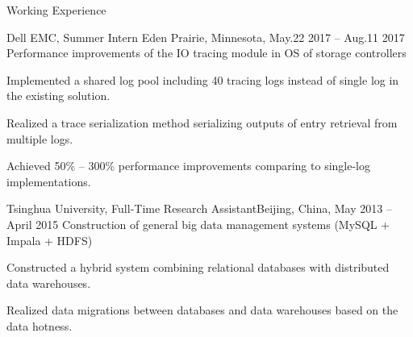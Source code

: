 \documentclass{resume} %
\begin{document}
\begin{rSection}{Working Experience}

\begin{rSubsection}{Dell EMC, Summer Intern} {Eden Prairie, Minnesota, May.22 2017 -- Aug.11 2017} 
{Performance improvements of the IO tracing module in OS of storage controllers} {}
\item Implemented a shared log pool including 40 tracing logs instead of single log in the existing solution.
\item Realized a trace serialization method serializing outputs of entry retrieval from multiple logs.
\item Achieved 50\% -- 300\% performance improvements comparing to single-log implementations.
\end{rSubsection}

\begin{rSubsection}{Tsinghua University, Full-Time Research Assistant}{Beijing, China, May 2013 -- April 2015}
{Construction of general big data management systems (MySQL + Impala + HDFS)}{}
\item Constructed a hybrid system combining relational databases with distributed data warehouses.
\item Realized data migrations between databases and data warehouses based on the data hotness. 
\end{rSubsection}

\end{rSection}
\end{document}

